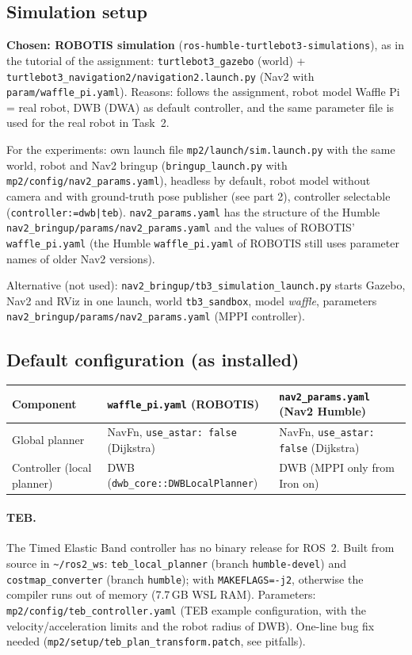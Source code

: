 \documentclass[10pt]{article}
\newcommand{\pkg}[1]{\texttt{#1}}
\begin{document}
\subsection{Simulation setup}
\textbf{Chosen: ROBOTIS simulation} (\pkg{ros-humble-turtlebot3-simulations}), as in the
tutorial of the assignment: \pkg{turtlebot3\_gazebo} (world) + \pkg{turtlebot3\_navigation2/navigation2.launch.py}
(Nav2 with \pkg{param/waffle\_pi.yaml}).
Reasons: follows the assignment, robot model Waffle Pi = real robot, DWB (DWA) as default
controller, and the same parameter file is used for the real robot in Task~2.

For the experiments: own launch file \pkg{mp2/launch/sim.launch.py} with the same world, robot and Nav2 bringup
(\pkg{bringup\_launch.py} with \pkg{mp2/config/nav2\_params.yaml}), headless by default, robot model without
camera and with ground-truth pose publisher (see part 2), controller selectable (\pkg{controller:=dwb|teb}).
\pkg{nav2\_params.yaml} has the structure of the Humble \pkg{nav2\_bringup/params/nav2\_params.yaml} and the values
of ROBOTIS' \pkg{waffle\_pi.yaml} (the Humble \pkg{waffle\_pi.yaml} of ROBOTIS still uses parameter names of older
Nav2 versions).

Alternative (not used): \pkg{nav2\_bringup/tb3\_simulation\_launch.py} starts Gazebo, Nav2 and RViz in one launch,
world \pkg{tb3\_sandbox}, model \emph{waffle}, parameters \pkg{nav2\_bringup/params/nav2\_params.yaml} (MPPI controller).

\subsection{Default configuration (as installed)}
\begin{tabular}{lll}
\toprule
Component & \pkg{waffle\_pi.yaml} (ROBOTIS) & \pkg{nav2\_params.yaml} (Nav2 Humble) \\
\midrule
Global planner & NavFn, \pkg{use\_astar: false} (Dijkstra) & NavFn, \pkg{use\_astar: false} (Dijkstra) \\
Controller (local planner) & DWB (\pkg{dwb\_core::DWBLocalPlanner}) & DWB (MPPI only from Iron on) \\
\bottomrule
\end{tabular}

\paragraph{TEB.} The Timed Elastic Band controller has no binary release for ROS~2. Built from source in
\pkg{\textasciitilde/ros2\_ws}: \pkg{teb\_local\_planner} (branch \pkg{humble-devel}) and \pkg{costmap\_converter}
(branch \pkg{humble}); with \pkg{MAKEFLAGS=-j2}, otherwise the compiler runs out of memory (7.7\,GB WSL RAM).
Parameters: \pkg{mp2/config/teb\_controller.yaml} (TEB example configuration, with the velocity/acceleration limits
and the robot radius of DWB). One-line bug fix needed (\pkg{mp2/setup/teb\_plan\_transform.patch}, see pitfalls).
\end{document}
